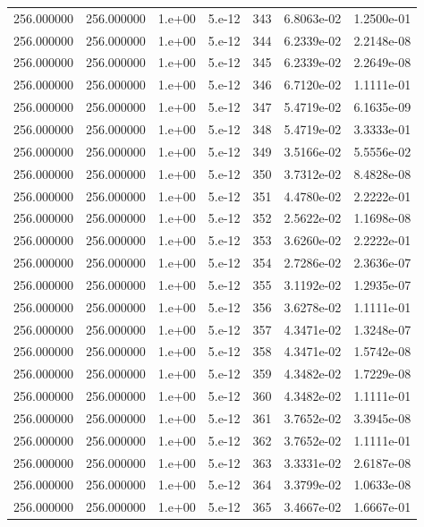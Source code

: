 \begin{table}[htbp]
\begin{tabular}{rrrrrrr}
256.000000 & 256.000000 & 1.e+00 & 5.e-12 & 343 & 6.8063e-02 & 1.2500e-01 \\
256.000000 & 256.000000 & 1.e+00 & 5.e-12 & 344 & 6.2339e-02 & 2.2148e-08 \\
256.000000 & 256.000000 & 1.e+00 & 5.e-12 & 345 & 6.2339e-02 & 2.2649e-08 \\
256.000000 & 256.000000 & 1.e+00 & 5.e-12 & 346 & 6.7120e-02 & 1.1111e-01 \\
256.000000 & 256.000000 & 1.e+00 & 5.e-12 & 347 & 5.4719e-02 & 6.1635e-09 \\
256.000000 & 256.000000 & 1.e+00 & 5.e-12 & 348 & 5.4719e-02 & 3.3333e-01 \\
256.000000 & 256.000000 & 1.e+00 & 5.e-12 & 349 & 3.5166e-02 & 5.5556e-02 \\
256.000000 & 256.000000 & 1.e+00 & 5.e-12 & 350 & 3.7312e-02 & 8.4828e-08 \\
256.000000 & 256.000000 & 1.e+00 & 5.e-12 & 351 & 4.4780e-02 & 2.2222e-01 \\
256.000000 & 256.000000 & 1.e+00 & 5.e-12 & 352 & 2.5622e-02 & 1.1698e-08 \\
256.000000 & 256.000000 & 1.e+00 & 5.e-12 & 353 & 3.6260e-02 & 2.2222e-01 \\
256.000000 & 256.000000 & 1.e+00 & 5.e-12 & 354 & 2.7286e-02 & 2.3636e-07 \\
256.000000 & 256.000000 & 1.e+00 & 5.e-12 & 355 & 3.1192e-02 & 1.2935e-07 \\
256.000000 & 256.000000 & 1.e+00 & 5.e-12 & 356 & 3.6278e-02 & 1.1111e-01 \\
256.000000 & 256.000000 & 1.e+00 & 5.e-12 & 357 & 4.3471e-02 & 1.3248e-07 \\
256.000000 & 256.000000 & 1.e+00 & 5.e-12 & 358 & 4.3471e-02 & 1.5742e-08 \\
256.000000 & 256.000000 & 1.e+00 & 5.e-12 & 359 & 4.3482e-02 & 1.7229e-08 \\
256.000000 & 256.000000 & 1.e+00 & 5.e-12 & 360 & 4.3482e-02 & 1.1111e-01 \\
256.000000 & 256.000000 & 1.e+00 & 5.e-12 & 361 & 3.7652e-02 & 3.3945e-08 \\
256.000000 & 256.000000 & 1.e+00 & 5.e-12 & 362 & 3.7652e-02 & 1.1111e-01 \\
256.000000 & 256.000000 & 1.e+00 & 5.e-12 & 363 & 3.3331e-02 & 2.6187e-08 \\
256.000000 & 256.000000 & 1.e+00 & 5.e-12 & 364 & 3.3799e-02 & 1.0633e-08 \\
256.000000 & 256.000000 & 1.e+00 & 5.e-12 & 365 & 3.4667e-02 & 1.6667e-01 \\

\end{tabular}
\end{table}
